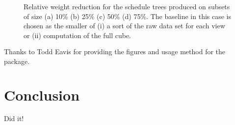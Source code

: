 \documentclass[12pt]{dalcsthesis}
\begin{document}
\begin{figure}
  \centering
  \qquad
  \qquad
  \qquad
  \caption{\label{fig-partial_compare}Relative weight reduction for the
  schedule trees produced on subsets of size (a) 10\% (b) 25\% (c)
  50\% (d) 75\%. The baseline in this case is chosen as the
  smaller of (i) a sort of the raw data set for each view or (ii)
  computation of the full cube.}
\end{figure}

Thanks to Todd Eavis for providing the figures and usage method for the package.

\chapter{Conclusion}

Did it!



\end{document}
